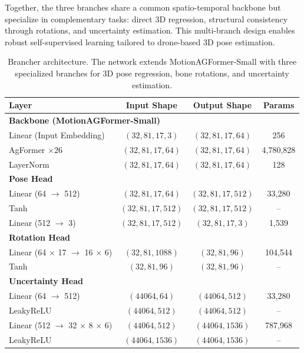 Together, the three branches share a common spatio-temporal backbone but specialize in complementary tasks: direct 3D regression, structural consistency through rotations, and uncertainty estimation. This multi-branch design enables 
robust self-supervised learning tailored to drone-based 3D pose estimation.
\begin{table}[H]
    \centering
    \caption{Brancher architecture. The network extends MotionAGFormer-Small with three specialized branches for 3D pose regression, bone rotations, and uncertainty estimation.}
    \label{tab:brancher_architecture}
    \renewcommand{\arraystretch}{1.2}
    \begin{tabular}{lccc}
    \hline
    \textbf{Layer} & \textbf{Input Shape} & \textbf{Output Shape} & \textbf{Params} \\
    \hline
    \multicolumn{4}{l}{\textbf{Backbone (MotionAGFormer-Small)}} \\
    Linear (Input Embedding) & $(32,81,17,3)$ & $(32,81,17,64)$ & 256 \\
    AgFormer $\times 26$ & $(32,81,17,64)$ & $(32,81,17,64)$ & 4,780,828 \\
    LayerNorm & $(32,81,17,64)$ & $(32,81,17,64)$ & 128 \\
    \hline
    \multicolumn{4}{l}{\textbf{Pose Head}} \\
    Linear (64 $\rightarrow$ 512) & $(32,81,17,64)$ & $(32,81,17,512)$ & 33,280 \\
    Tanh & $(32,81,17,512)$ & $(32,81,17,512)$ & -- \\
    Linear (512 $\rightarrow$ 3) & $(32,81,17,512)$ & $(32,81,17,3)$ & 1,539 \\
    \hline
    \multicolumn{4}{l}{\textbf{Rotation Head}} \\
    Linear (64 $\times$ 17 $\rightarrow$ 16 $\times$ 6) & $(32,81,1088)$ & $(32,81,96)$ & 104,544 \\
    Tanh & $(32,81,96)$ & $(32,81,96)$ & -- \\
    \hline
    \multicolumn{4}{l}{\textbf{Uncertainty Head}} \\
    Linear (64 $\rightarrow$ 512) & $(44064,64)$ & $(44064,512)$ & 33,280 \\
    LeakyReLU & $(44064,512)$ & $(44064,512)$ & -- \\
    Linear (512 $\rightarrow$ 32 $\times$ 8 $\times$ 6) & $(44064,512)$ & $(44064,1536)$ & 787,968 \\
    LeakyReLU & $(44064,1536)$ & $(44064,1536)$ & -- \\

\end{tabular}
\end{table}
